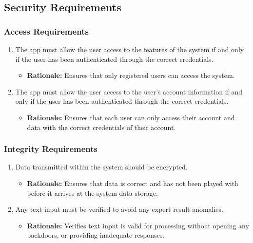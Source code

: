 \documentclass[]{article}
\begin{document}
\begin{enumerate}

\subsection{Security Requirements}
\label{sub:security_requirements}

\subsubsection{Access Requirements}
\label{ssub:access_requirements}
\begin{enumerate}[{SR-AC}1. ]
\item The app must allow the user access to the features of the system if and only if the user has been authenticated through the correct credentials.
    \begin{itemize}
        \item \textbf{Rationale:} Ensures that only registered users can access the system.
    \end{itemize}

\item The app must allow the user access to the user's account information if and only if the user has been authenticated through the correct credentials.
    \begin{itemize}
        \item \textbf{Rationale:} Ensures that each user can only access their account and data with the correct credentials of their account.
    \end{itemize}
\end{enumerate}

\subsubsection{Integrity Requirements}
\label{ssub:integrity_requirements}
\begin{enumerate}[{SR-INT}1. ]
\item Data transmitted within the system should be encrypted.
    \begin{itemize}
        \item \textbf{Rationale:} Ensures that data is correct and has not been played with before it arrives at the system data storage.
    \end{itemize}

\item Any text input must be verified to avoid any expert result anomalies.
    \begin{itemize}
        \item \textbf{Rationale:} Verifies text input is valid for processing without opening any backdoors, or providing inadequate responses.
    \end{itemize}
\end{enumerate}


\end{enumerate}
\end{document}
